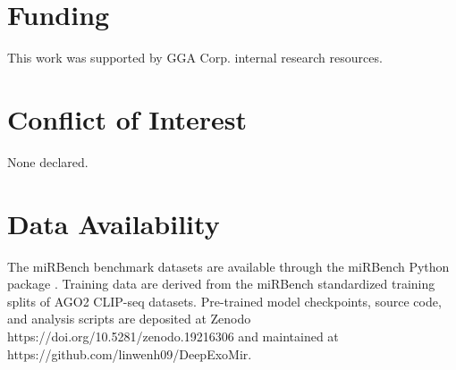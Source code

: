 \documentclass[unnumsec,webpdf,contemporary,large]{oup-authoring-template}
\begin{document}
\section*{Funding}

This work was supported by GGA Corp. internal research resources.

\section*{Conflict of Interest}

None declared.

\section*{Data Availability}

The miRBench benchmark datasets are available through the miRBench Python package \citep{sammut2025}. Training data are derived from the miRBench standardized training splits of AGO2 CLIP-seq datasets. Pre-trained model checkpoints, source code, and analysis scripts are deposited at Zenodo https://doi.org/10.5281/zenodo.19216306 and maintained at https://github.com/linwenh09/DeepExoMir.


\end{document}
